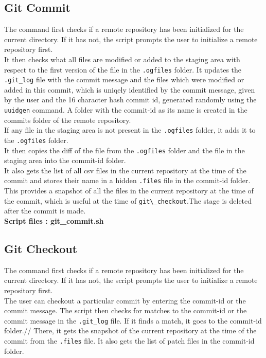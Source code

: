 \documentclass{article}
\begin{document}
\subsection{Git Commit}
The command first checks if a remote repository has been initialized for the current directory. If it has not, the script prompts the user to initialize a remote repository first.\\
It then checks what all files are modified or added to the staging area with respect to the first version of the file in the \verb".ogfiles" folder. It updates the \verb".git_log" file with the commit message and the files which were modified or added in this commit, which is uniqely identified by the commit message, given by the user and the 16 character hash commit id, generated randomly using the \verb"uuidgen" command. A folder with the commit-id as its name is created in the commits folder of the remote repository.\\

If any file in the staging area is not present in the \verb".ogfiles" folder, it adds it to the \verb".ogfiles" folder.\\ It then copies the diff of the file from the \verb".ogfiles" folder and the file in the staging area into the commit-id folder.\\

It also gets the list of all csv files in the current repository at the time of the commit and stores their name in a hidden \verb".files" file in the commit-id folder. This provides a snapshot of all the files in the current repository at the time of the commit, which is useful at the time of \verb"git\_checkout".The stage is deleted after the commit is made.\\

\textbf{Script files : git\_commit.sh}

\subsection{Git Checkout}
The command first checks if a remote repository has been initialized for the current directory. If it has not, the script prompts the user to initialize a remote repository first.\\
The user can checkout a particular commit by entering the commit-id or the commit message. The script then checks for matches to the commit-id or the commit message in the \verb".git_log" file. If it finds a match, it goes to the commit-id folder.//
There, it gets the snapshot of the current repository at the time of the commit from the \verb".files" file. It also gets the list of patch files in the commit-id folder.\\
\end{document}
